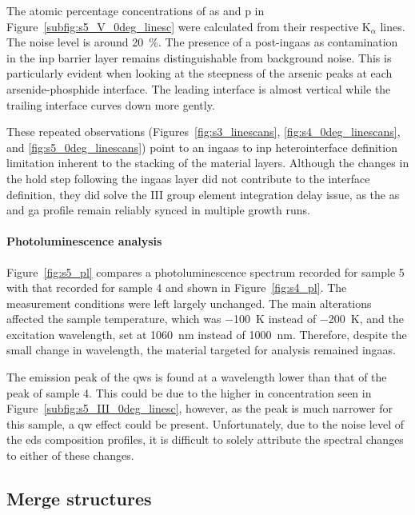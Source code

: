 The atomic percentage concentrations of \acl{as} and \acl{p} in Figure~\ref{subfig:s5_V_0deg_linesc} were calculated from their respective K\(_\alpha\) lines. The noise level is around \qty{20}{\%}. The presence of a post-\acs{ingaas} \acl{as} contamination in the \acs{inp} barrier layer remains distinguishable from background noise. This is particularly evident when looking at the steepness of the arsenic peaks at each arsenide-phosphide interface. The leading interface is almost vertical while the trailing interface curves down more gently.

These repeated observations (Figures~\ref{fig:s3_linescans}, \ref{fig:s4_0deg_linescans}, and \ref{fig:s5_0deg_linescans}) point to an \acs{ingaas} to \acs{inp} heterointerface definition limitation inherent to the stacking of the material layers. Although the changes in the hold step following the \acs{ingaas} layer did not contribute to the interface definition, they did solve the III group element integration delay issue, as the \acl{as} and \acs{ga} profile remain reliably synced in multiple growth runs.
\par

\paragraph{Photoluminescence analysis} Figure~\ref{fig:s5_pl} compares a photoluminescence spectrum recorded for sample 5 with that recorded for sample 4 and shown in Figure~\ref{fig:s4_pl}. The measurement conditions were left largely unchanged. The main alterations affected the sample temperature, which was \qty{-100}{\kelvin} instead of \qty{-200}{\kelvin}, and the excitation wavelength, set at \qty{1060}{\nano\metre} instead of \qty{1000}{\nano\metre}. Therefore, despite the small change in wavelength, the material targeted for analysis remained \acs{ingaas}.

The emission peak of the \acl{qw}s is found at a wavelength lower than that of the peak of sample 4. This could be due to the higher \acl{in} concentration seen in Figure~\ref{subfig:s5_III_0deg_linesc}, however, as the peak is much narrower for this sample, a \acl{qw} effect could be present. Unfortunately, due to the noise level of the \acs{eds} composition profiles, it is difficult to solely attribute the spectral changes to either of these changes.
\par

\subsection{Merge structures}
\label{sec:merge}


